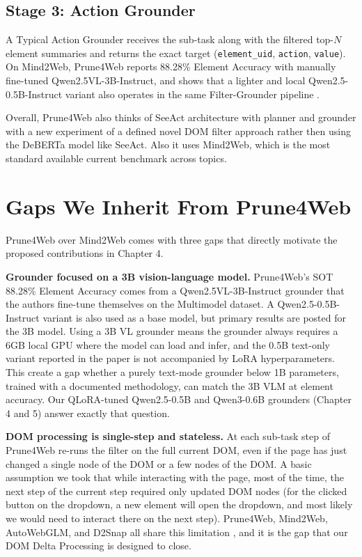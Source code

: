     \subsection{Stage 3: Action Grounder}
    A Typical Action Grounder receives the sub-task along with the filtered top-$N$ element summaries and returns the exact target (\texttt{element\_uid}, \texttt{action}, \texttt{value}). On Mind2Web, Prune4Web reports 88.28\% Element Accuracy with manually fine-tuned Qwen2.5VL-3B-Instruct, and shows that a lighter and local Qwen2.5-0.5B-Instruct variant also operates in the same Filter-Grounder pipeline \cite{zhang2025prune4web}.
    

\noindent Overall, Prune4Web also thinks of SeeAct architecture with planner and grounder with a new experiment of a defined novel DOM filter approach rather then using the DeBERTa model like SeeAct. Also it uses Mind2Web, which is the most standard available current benchmark across topics.


\section{Gaps We Inherit From Prune4Web}

Prune4Web over Mind2Web comes with three gaps that directly motivate the proposed contributions in Chapter 4.

\textbf{Grounder focused on a 3B vision-language model.}
Prune4Web's SOT 88.28\% Element Accuracy comes from a Qwen2.5VL-3B-Instruct grounder that the authors fine-tune themselves on the Multimodel dataset. A Qwen2.5-0.5B-Instruct variant is also used as a base model, but primary results are posted for the 3B model\cite{zhang2025prune4web}. Using a 3B VL grounder means the grounder always requires a 6GB local GPU where the model can load and infer, and the 0.5B text-only variant reported in the paper is not accompanied by LoRA hyperparameters. This create a gap whether a purely text-mode grounder below 1B parameters, trained with a documented methodology, can match the 3B VLM at element accuracy. Our QLoRA-tuned Qwen2.5-0.5B and Qwen3-0.6B grounders (Chapter 4 and 5) answer exactly that question.

\textbf{DOM processing is single-step and stateless.}
At each sub-task step of Prune4Web re-runs the filter on the full current DOM, even if the page has just changed a single node of the DOM or a few nodes of the DOM. A basic assumption we took that while interacting with the page, most of the time, the next step of the current step required only updated DOM nodes (for the clicked button on the dropdown, a new element will open the dropdown, and most likely we would need to interact there on the next step). Prune4Web, Mind2Web, AutoWebGLM, and D2Snap all share this limitation \cite{zhang2025prune4web} \cite{deng2023mind2webgeneralistagentweb} \cite{lai2024autowebglm} \cite{schiepanski2025d2snap}, and it is the gap that our DOM Delta Processing is designed to close.

